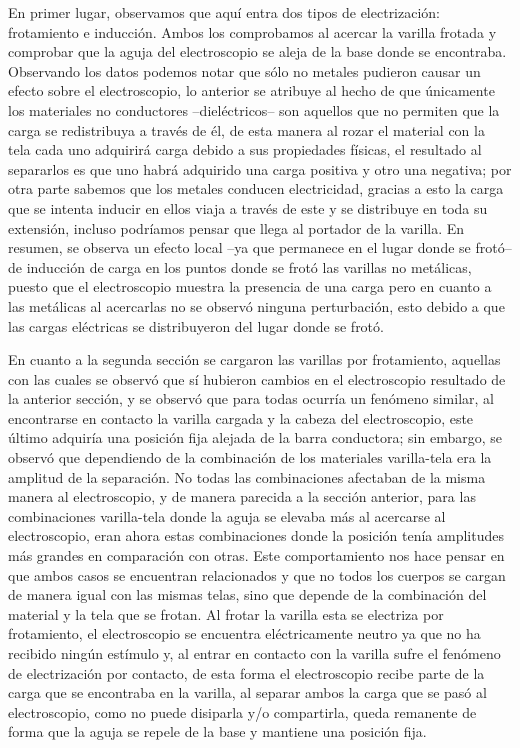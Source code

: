 \documentclass[letterpaper, 11 pt]{article}
\begin{document}
\begin{multicols*}{2}
En primer lugar, observamos que aquí entra dos tipos de electrización: frotamiento e inducción. Ambos los comprobamos al acercar la varilla frotada y comprobar que la aguja del electroscopio se aleja de la base donde se encontraba. Observando los datos podemos notar que sólo no metales pudieron causar un efecto sobre el electroscopio, lo anterior se atribuye al hecho de que únicamente los materiales no conductores --dieléctricos-- son aquellos que no permiten que la carga se redistribuya a través de él, de esta manera al rozar el material con la tela  cada uno adquirirá carga debido a sus propiedades físicas, el resultado al separarlos es que uno habrá adquirido una carga positiva y otro una negativa; por otra parte sabemos que los metales conducen electricidad, gracias a esto la carga que se intenta inducir en ellos viaja a través de este y se distribuye en toda su extensión, incluso podríamos pensar que llega al portador de la varilla. En resumen, se observa un efecto local --ya que permanece en el lugar donde se frotó-- de inducción de carga en los puntos donde se frotó las varillas no metálicas, puesto que el electroscopio muestra la presencia de una carga pero en cuanto a las metálicas al acercarlas no se observó ninguna perturbación, esto debido a que las cargas eléctricas se distribuyeron del lugar donde se frotó.

En cuanto a la segunda sección se cargaron las varillas por frotamiento, aquellas con las cuales se observó que sí hubieron cambios en el electroscopio resultado de la anterior sección, y se observó que para todas ocurría un fenómeno similar, al encontrarse en contacto la varilla cargada y la cabeza del electroscopio, este último adquiría una posición fija alejada de la barra conductora; sin embargo, se observó que dependiendo de la combinación de los materiales varilla-tela era la amplitud de la separación. No todas las combinaciones afectaban de la misma manera al electroscopio, y de manera parecida a la sección anterior, para las combinaciones varilla-tela donde la aguja se elevaba más al acercarse al electroscopio, eran ahora estas combinaciones donde la posición tenía amplitudes más grandes en comparación con otras. Este comportamiento nos hace pensar en que ambos casos se encuentran relacionados y que no todos los cuerpos se cargan de manera igual con las mismas telas, sino que depende de la combinación del material y la tela que se frotan. Al frotar la varilla esta se electriza por frotamiento, el electroscopio se encuentra eléctricamente neutro ya que no ha recibido ningún estímulo y, al entrar en contacto con la varilla sufre el fenómeno de electrización por contacto, de esta forma el electroscopio recibe parte de la carga que se encontraba en la varilla, al separar ambos la carga que se pasó al electroscopio, como no puede disiparla y/o compartirla, queda remanente de forma que la aguja se repele de la base y mantiene una posición fija.


\end{multicols*}
\end{document}

